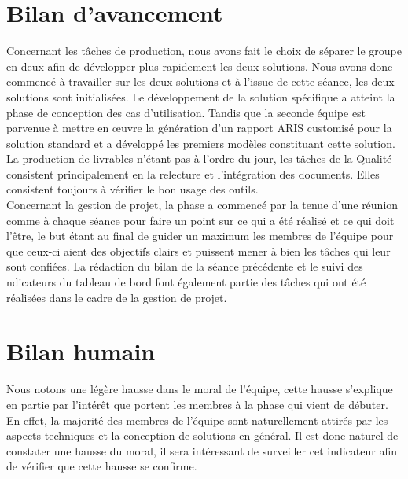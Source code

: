 
\section{Bilan d'avancement}

Concernant les tâches de production, nous avons fait le choix de séparer le groupe en deux afin de développer plus rapidement les deux solutions. Nous avons donc commencé à travailler sur les deux solutions et à l'issue de cette séance, les deux solutions sont initialisées. Le développement de la solution spécifique a atteint la phase de conception des cas d'utilisation. Tandis que la seconde équipe est parvenue à mettre en \oe{}uvre la génération d'un rapport ARIS customisé pour la solution standard et a développé les premiers modèles constituant cette solution. \\

La production de livrables n'étant pas à l'ordre du jour, les tâches de la Qualité consistent principalement en la relecture et l'intégration des documents. Elles consistent toujours à vérifier le bon usage des outils. \\

Concernant la gestion de projet, la phase a commencé par la tenue d'une réunion comme à chaque séance pour faire un point sur ce qui a été réalisé et ce qui doit l'être, le but étant au final de guider un maximum les membres de l'équipe pour que ceux-ci aient des objectifs clairs et puissent mener à bien les tâches qui leur sont confiées. La rédaction du bilan de la séance précédente et le suivi des ndicateurs du tableau de bord font également partie des tâches qui ont été réalisées dans le cadre de la gestion de projet. 

\section{Bilan humain}

Nous notons une légère hausse dans le moral de l'équipe, cette hausse s'explique en partie par l'intérêt que portent les membres à la phase qui vient de débuter. En effet, la majorité des membres de l'équipe sont naturellement attirés par les aspects techniques et la conception de solutions en général. Il est donc naturel de constater une hausse du moral, il sera intéressant de surveiller cet indicateur afin de vérifier que cette hausse se confirme. 
